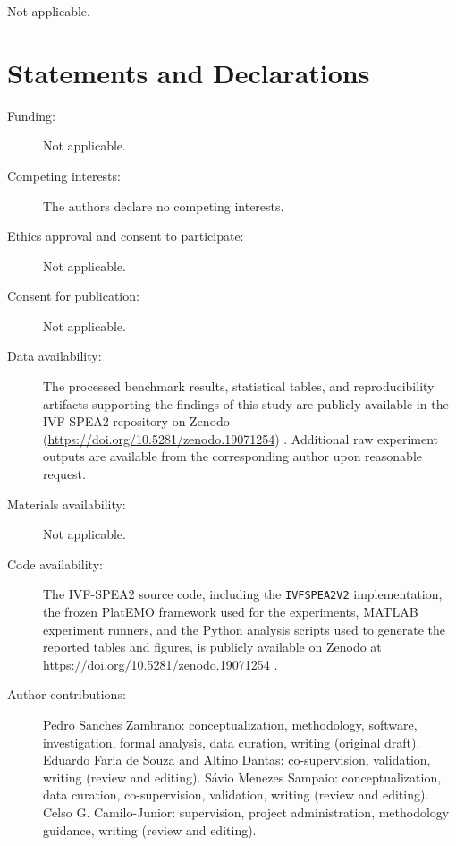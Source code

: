 \documentclass[pdflatex,sn-mathphys-ay]{sn-jnl}%
\theoremstyle{thmstyleone}%
\theoremstyle{thmstyletwo}%
\theoremstyle{thmstylethree}%
\begin{document}
\backmatter


Not applicable.

\section*{Statements and Declarations}

\begin{description}
	\item[Funding:] Not applicable.
	\item[Competing interests:] The authors declare no competing interests.
	\item[Ethics approval and consent to participate:] Not applicable.
	\item[Consent for publication:] Not applicable.
	\item[Data availability:] The processed benchmark results, statistical tables, and reproducibility artifacts supporting the findings of this study are publicly available in the IVF-SPEA2 repository on Zenodo (\url{https://doi.org/10.5281/zenodo.19071254}) \citep{zambrano2026ivfspea2repo}. Additional raw experiment outputs are available from the corresponding author upon reasonable request.
	\item[Materials availability:] Not applicable.
	\item[Code availability:] The IVF-SPEA2 source code, including the \texttt{IVFSPEA2V2} implementation, the frozen PlatEMO framework used for the experiments, MATLAB experiment runners, and the Python analysis scripts used to generate the reported tables and figures, is publicly available on Zenodo at \url{https://doi.org/10.5281/zenodo.19071254} \citep{zambrano2026ivfspea2repo}.
	\item[Author contributions:] Pedro Sanches Zambrano: conceptualization, methodology, software, investigation, formal analysis, data curation, writing (original draft). Eduardo Faria de Souza and Altino Dantas: co-supervision, validation, writing (review and editing). S\'avio Menezes Sampaio: conceptualization, data curation, co-supervision, validation, writing (review and editing). Celso G. Camilo-Junior: supervision, project administration, methodology guidance, writing (review and editing).
\end{description}



\appendix
\end{document}
